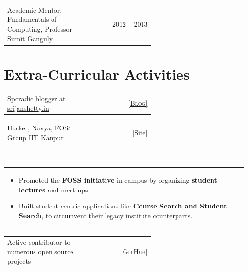\documentclass[a4paper]{article} %
\newcommand{\verticalspacing}{-0.25cm}
\newcommand{\headspace}{-0.3cm}
\newcommand{\bulletspace}{0.7cm}
\newcommand{\projectheadspacing}{6.9cm}
\newcommand{\gitproject}[3]{%
    \begin{tabular}{p{0.60\linewidth}r}
        \textcolor{NavyBlue}{\small #2} & \multicolumn{1}{m{ \projectheadspacing{} }}{\raggedleft #1}\\
    \end{tabular}\\
    \begin{tabular}{p{0.98\linewidth}}
        \vspace{\headspace{}}
        \small{#3}
    \end{tabular}
    \vspace{\verticalspacing{}}
    \vspace{-0.2cm} %
}
\newcommand{\skill}[2]{%
    \begin{tabular}{p{0.60\linewidth}r}
        \small {#2} & \multicolumn{1}{m{ \projectheadspacing{} }}{\raggedleft \textsc{\small #1}}\\
    \end{tabular}
    \vspace{\verticalspacing{}}
}
\begin{document}
\skill
    {2012 -- 2013}
    {Academic Mentor, Fundamentals of Computing, Professor Sumit Ganguly}


\section{Extra-Curricular Activities}

\skill {\href{srijanshetty.quora.com} {[Blog]}}
       {Sporadic blogger at \href{srijanshetty.in} {srijanshetty.in}}

\gitproject
    {\href{https://github.com/navya} {\small{[Site]}}}
    {Hacker, Navya, FOSS Group IIT Kanpur}
    {%
        \begin{itemize}[leftmargin=\bulletspace{}]
            \item Promoted the \textbf{FOSS initiative} in campus by organizing \textbf{student lectures} and meet-ups.
            \item Built student-centric applications like \textbf{Course Search and Student Search}, to circumvent
                their legacy institute counterparts.
        \end{itemize}
    }

\skill
    {\href{https://github.com/srijanshetty} {\small{[GitHub]}}}
    {Active contributor to numerous open source projects}
\end{document}
